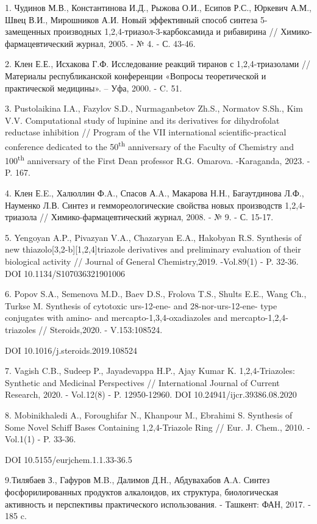 \begin{noparindent}
1. Чудинов М.В., Константинова И.Д., Рыжова О.И., Есипов Р.С., Юркевич
А.М., Швец В.И., Мирошников А.И. Новый эффективный способ синтеза
5-замещенных производных 1,2,4-триазол-3-карбоксамида и рибавирина //
Химико-фармацевтический журнал, 2005. - № 4. - С. 43-46.

2. Клен Е.Е., Исхакова Г.Ф. Исследование реакций тиранов с
1,2,4-триазолами // Материалы республиканской конференции «Вопросы
теоретической и практической медицины». -- Уфа, 2000. - C. 51.

3. Pustolaikina I.A., Fazylov S.D., Nurmaganbetov Zh.S., Normatov S.Sh.,
Kim V.V. Computational study of lupinine and its derivatives for
dihydrofolat reductase inhibition // Program of the VII international
scientific-practical conference dedicated to the 50\textsuperscript{th}
anniversary of the Faculty of Chemistry and 100\textsuperscript{th}
anniversary of the First Dean professor R.G. Omarova. -Karaganda, 2023.
- P. 167.

4. Клен Е.E., Халюллин Ф.A., Спасов А.A., Макарова Н.Н., Багаутдинова
Л.Ф., Науменко Л.В. Синтез и геммореологические свойства новых
производств 1,2,4-триазола // Химико-фармацевтический журнал, 2008. - №
9. - С. 15-17.

5. Yengoyan A.P., Pivazyan V.A., Chazaryan E.A., Hakobyan R.S. Synthesis
of new thiazolo{[}3,2-b{]}{[}1,2,4{]}triazole derivatives and
preliminary evaluation of their biological activity // Journal of
General Chemistry,2019. -Vol.89(1) - P. 32-36. DOI
10.1134/S107036321901006

6. Popov S.A., Semenova M.D., Baev D.S., Frolova T.S., Shults E.E., Wang
Ch., Turkse M. Synthesis of cytotoxic urs-12-ene- and 28-nor-urs-12-ene-
type conjugates with amino- and mercapto-1,3,4-oxadiazoles and
mercapto-1,2,4-triazoles // Steroids,2020. - V.153:108524.

DOI 10.1016/j.steroids.2019.108524

7. Vagish C.B., Sudeep P., Jayadevappa H.P., Ajay Kumar K.
1,2,4-Triazoles: Synthetic and Medicinal Perspectives // International
Journal of Current Research, 2020. - Vol.12(8) - P. 12950-12960. DOI
10.24941/ijcr.39386.08.2020

8. Mobinikhaledi A., Foroughifar N., Khanpour M., Ebrahimi S. Synthesis
of Some Novel Schiff Bases Containing 1,2,4-Triazole Ring // Eur. J.
Chem., 2010. -Vol.1(1) - P. 33-36.

DOI 10.5155/eurjchem.1.1.33-36.5

9.Тилябаев З., Гафуров М.B., Далимов Д.Н., Абдувахабов А.A. Синтез
фосфорилированных продуктов алкалоидов, их структура, биологическая
активность и перспективы практического использования. - Ташкент: ФАН,
2017. - 185 c.


\end{noparindent}
